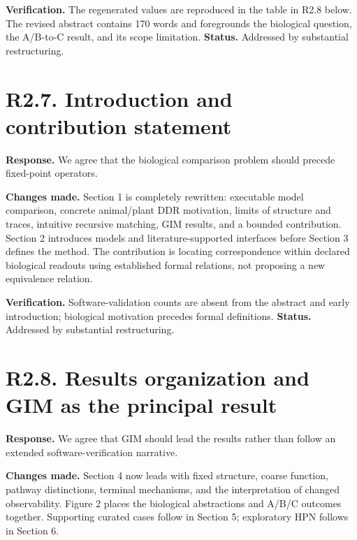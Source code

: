 \documentclass[11pt]{article}
\begin{document}
\textbf{Verification.} The regenerated values are reproduced in the table in
R2.8 below. The revised abstract contains 170 words and foregrounds the
biological question, the A/B-to-C result, and its scope limitation.
\textbf{Status.} Addressed by substantial restructuring.

\section*{R2.7. Introduction and contribution statement}
\textbf{Response.} We agree that the biological comparison problem should
precede fixed-point operators.

\textbf{Changes made.} Section 1 is completely rewritten: executable model
comparison, concrete animal/plant DDR motivation, limits of structure and
traces, intuitive recursive matching, GIM results, and a bounded contribution.
Section 2 introduces models and literature-supported interfaces before
Section 3 defines the method. The contribution is locating correspondence
within declared biological readouts using established formal relations,
not proposing a new equivalence relation.

\textbf{Verification.} Software-validation counts are absent from the abstract
and early introduction; biological motivation precedes formal definitions.
\textbf{Status.} Addressed by substantial restructuring.

\section*{R2.8. Results organization and GIM as the principal result}
\textbf{Response.} We agree that GIM should lead the results rather than follow
an extended software-verification narrative.

\textbf{Changes made.} Section 4 now leads with fixed structure, coarse function,
pathway distinctions, terminal mechanisms, and the interpretation of changed
observability. Figure 2 places the biological abstractions and A/B/C outcomes
together. Supporting curated cases follow in Section 5; exploratory HPN follows
in Section 6.
\end{document}
